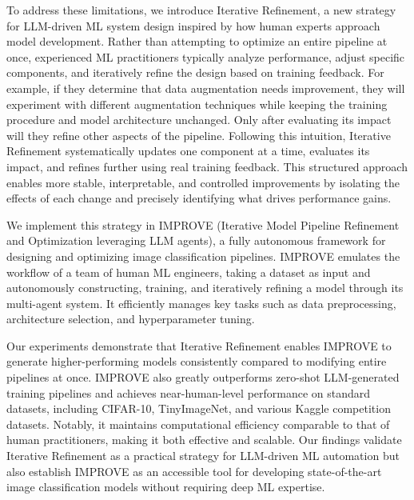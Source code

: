 To address these limitations, we introduce Iterative Refinement, a new strategy for LLM-driven ML system design inspired by how human experts approach model development. Rather than attempting to optimize an entire pipeline at once, experienced ML practitioners typically analyze performance, adjust specific components, and iteratively refine the design based on training feedback. For example, if they determine that data augmentation needs improvement, they will experiment with different augmentation techniques while keeping the training procedure and model architecture unchanged. Only after evaluating its impact will they refine other aspects of the pipeline. Following this intuition, Iterative Refinement systematically updates one component at a time, evaluates its impact, and refines further using real training feedback. This structured approach enables more stable, interpretable, and controlled improvements by isolating the effects of each change and precisely identifying what drives performance gains.

We implement this strategy in IMPROVE (Iterative Model Pipeline Refinement and Optimization leveraging LLM agents), a fully autonomous framework for designing and optimizing image classification pipelines. IMPROVE emulates the workflow of a team of human ML engineers, taking a dataset as input and autonomously constructing, training, and iteratively refining a model through its multi-agent system. It efficiently manages key tasks such as data preprocessing, architecture selection, and hyperparameter tuning.

Our experiments demonstrate that Iterative Refinement enables IMPROVE to generate higher-performing models consistently compared to modifying entire pipelines at once. IMPROVE also greatly outperforms zero-shot LLM-generated training pipelines and achieves near-human-level performance on standard datasets, including CIFAR-10, TinyImageNet, and various Kaggle competition datasets. Notably, it maintains computational efficiency comparable to that of human practitioners, making it both effective and scalable. Our findings validate Iterative Refinement as a practical strategy for LLM-driven ML automation but also establish IMPROVE as an accessible tool for developing state-of-the-art image classification models without requiring deep ML expertise.


